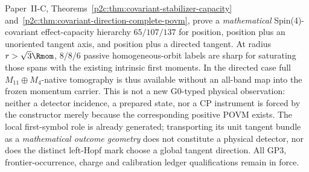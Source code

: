 \documentclass[12pt,a4paper]{article}
\begin{document}
\begin{remark}
\label{p2a:rem:v270-covariant-readout-ledger}
Paper~II-C, Theorems~\ref{p2c:thm:covariant-stabilizer-capacity}
and~\ref{p2c:thm:covariant-direction-complete-povm}, prove a
\emph{mathematical} Spin(4)-covariant effect-capacity hierarchy
$65/107/137$ for position, position plus an unoriented tangent axis,
and position plus a directed tangent. At radius $r>\sqrt3\Rmom$,
$8/8/6$ passive homogeneous-orbit labels are sharp for saturating
those spans with the existing intrinsic first moments.  In the
directed case full $M_{11}\oplus M_4$-native tomography is thus
available without an all-band map into the frozen momentum carrier.
This is not a new G0-typed physical observation: neither a detector
incidence, a prepared state, nor a CP instrument is forced by the
constructor merely because the corresponding positive POVM exists.
The local first-symbol role is already generated; transporting its
unit tangent bundle as a \emph{mathematical outcome geometry} does not
constitute a physical detector, nor does the distinct left-Hopf mark
choose a global tangent direction.  All GP3, frontier-occurrence,
charge and calibration ledger qualifications remain in force.
\end{remark}
\end{document}
